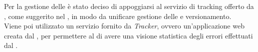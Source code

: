			Per la gestione delle  è stato deciso di appoggiarsi al servizio di  tracking offerto da , come suggerito nel , in modo da unificare gestione delle  e versionamento. \\
			Viene poi utilizzato un servizio fornito da \textit{Tracker}, ovvero un'applicazione web creata dal \groupname, per permettere al  di avere una visione statistica degli errori effettuati dal .
